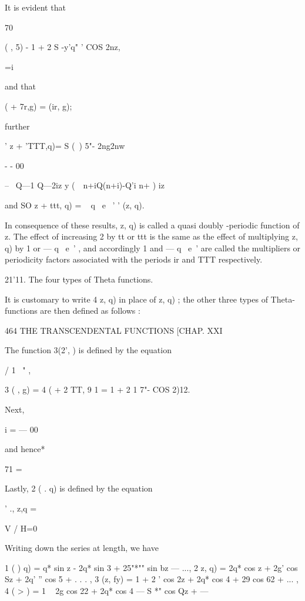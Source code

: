 It is evident that 

 70 

  ( , 5) - 1 + 2 S  -y'q" ' COS 2nz, 





 =i 


and that 


 (  + 7r,g) =  (ir, g); 


further 


'  z + 'TTT,q)= S (\ ) 5"- 2ng2nw 

 - - 00 



-- \  Q—1 Q—2iz y (\ \ n+iQ(n+i)-Q'i n+ ) iz 

and SO    z + ttt, q) = ~ q~  e~ '  '  (z, q). 

In consequence of these results,   z, q) is called a quasi doubly -periodic 
function of z. The effect of increasing 2  by tt or ttt is the same as the effect 
of multiplying    z, q) by 1 or — q~ e~' , and accordingly 1 and — q~ e~'   are 
called the multipliers or periodicity factors associated with the periods ir and 
TTT respectively. 

21'11. The four types of Theta functions. 

It is customary to write  4  z, q) in place of    z, q) ; the other three 
types of Theta-functions are then defined as follows : 



464 THE TRANSCENDENTAL FUNCTIONS [CHAP. XXI 

The function  3(2',  ) is defined by the equation 

/ 1 \ "  , 

 3 ( , g) =  4 (   + 2 TT, 9 1 = 1 + 2 1 7"- COS 2)12. 

Next, %

 i = — 00 

and hence* %

71 = 

Lastly,  2 ( . q) is defined by the equation 

' ., z,q  = %

V   / H=0 

Writing down the series at length, we have 

 1 ( ) q) =  q* sin z - 2q* sin 3  + 25"*"" sin bz — ..., 
 2  z, q) = 2q* cos z + 2g' cos Sz + 2q' '' cos 5  + . . . , 
 3 (z, fy) = 1 + 2 ' cos 2z + 2q* cos 4  + 29  cos 62 + ... , 
 4 ( >  ) = 1 ~ 2g cos 22 + 2q* cos 4  — S *" cos Qz + — 

